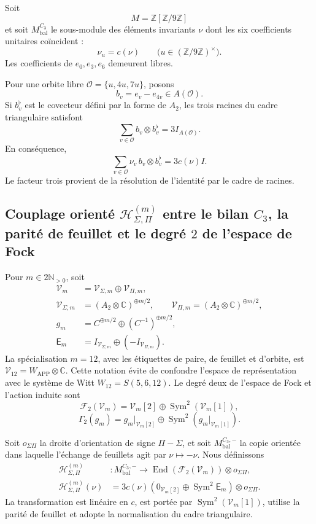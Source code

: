 Soit
\[
M=\mathbb Z[\mathbb Z/9\mathbb Z]
\]
et soit \(M_{\mathrm{bal}}^{C_3}\) le sous-module des éléments invariants
\(\nu\) dont les six coefficients unitaires coïncident :
\[
\nu_u=c(\nu)
\qquad
\bigl(u\in(\mathbb Z/9\mathbb Z)^\times\bigr).
\]
Les coefficients de \(e_0,e_3,e_6\) demeurent libres.

Pour une orbite libre
\(\mathcal O=\{u,4u,7u\}\), posons
\[
b_v=e_v-e_{4v}\in A(\mathcal O).
\]
Si \(b_v^\flat\) est le covecteur défini par la forme de \(A_2\), les trois
racines du cadre triangulaire satisfont
\[
\boxed{
\sum_{v\in\mathcal O}b_v\otimes b_v^\flat
=3I_{A(\mathcal O)}.}
\]
En conséquence,
\[
\sum_{v\in\mathcal O}\nu_v\,b_v\otimes b_v^\flat
=3c(\nu)I.
\]
Le facteur trois provient de la résolution de l'identité par le cadre de
racines.

\subsection{Couplage orienté \(\mathcal H_{\Sigma,\Pi}^{(m)}\) entre le bilan \(C_3\), la parité de feuillet et le degré \(2\) de l'espace de Fock}

Pour \(m\in2\mathbb N_{>0}\), soit
\[
\begin{aligned}
\mathcal V_m&=\mathcal V_{\Sigma,m}\oplus\mathcal V_{\Pi,m},\\
\mathcal V_{\Sigma,m}&=(A_2\otimes\mathbb C)^{\oplus m/2},\qquad
\mathcal V_{\Pi,m}=(A_2\otimes\mathbb C)^{\oplus m/2},\\
g_m&=C^{\oplus m/2}\oplus(C^{-1})^{\oplus m/2},\\
\mathsf E_m&=I_{\mathcal V_{\Sigma,m}}
\oplus(-I_{\mathcal V_{\Pi,m}}).
\end{aligned}
\]
La spécialisation \(m=12\), avec les étiquettes de paire, de feuillet et d'orbite,
est \(\mathcal V_{12}=W_{\mathrm{APP}}\otimes\mathbb C\). Cette notation
évite de confondre l'espace de représentation avec le système de Witt
\(W_{12}=S(5,6,12)\). Le degré deux de l'espace de
Fock et l'action induite sont
\[
\mathcal F_2(\mathcal V_m)
=\mathcal V_m[2]\oplus\operatorname{Sym}^2(\mathcal V_m[1]),
\]
\[
\Gamma_2(g_m)
=g_m|_{\mathcal V_m[2]}
\oplus\operatorname{Sym}^2(g_m|_{\mathcal V_m[1]}).
\]

Soit \(o_{\Sigma\Pi}\) la droite d'orientation de signe
\(\Pi-\Sigma\), et soit \(M_{\mathrm{bal}}^{C_3,-}\) la copie orientée dans
laquelle l'échange de feuillets agit par \(\nu\mapsto-\nu\). Nous définissons
\[
\boxed{
\begin{aligned}
\mathcal H_{\Sigma,\Pi}^{(m)}&:
M_{\mathrm{bal}}^{C_3,-}\longrightarrow
\operatorname{End}(\mathcal F_2(\mathcal V_m))\otimes o_{\Sigma\Pi},\\
\mathcal H_{\Sigma,\Pi}^{(m)}(\nu)
&=3c(\nu)
\left(0_{\mathcal V_m[2]}\oplus\operatorname{Sym}^2\mathsf E_m\right)
\otimes o_{\Sigma\Pi}.
\end{aligned}}
\]
La transformation est linéaire en \(c\), est portée par
\(\operatorname{Sym}^2(\mathcal V_m[1])\), utilise la parité de feuillet et adopte la
normalisation du cadre triangulaire.

